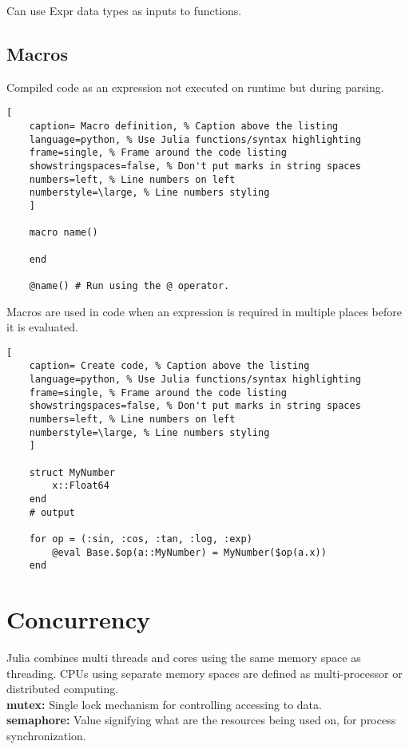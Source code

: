 \documentclass[11pt]{scrartcl} %
\begin{document}
Can use Expr data types as inputs to functions.

\subsection{Macros}

Compiled code as an expression not executed on runtime but during parsing.

\begin{lstlisting}[
	caption= Macro definition, % Caption above the listing
	language=python, % Use Julia functions/syntax highlighting
	frame=single, % Frame around the code listing
	showstringspaces=false, % Don't put marks in string spaces
	numbers=left, % Line numbers on left
	numberstyle=\large, % Line numbers styling
	]

	macro name()

	end

	@name() # Run using the @ operator.

\end{lstlisting}

Macros are used in code when an expression is required in multiple places before it is evaluated.

\begin{lstlisting}[
	caption= Create code, % Caption above the listing
	language=python, % Use Julia functions/syntax highlighting
	frame=single, % Frame around the code listing
	showstringspaces=false, % Don't put marks in string spaces
	numbers=left, % Line numbers on left
	numberstyle=\large, % Line numbers styling
	]

	struct MyNumber
    	x::Float64
	end
	# output

	for op = (:sin, :cos, :tan, :log, :exp)
    	@eval Base.$op(a::MyNumber) = MyNumber($op(a.x))
	end

\end{lstlisting}

\newpage
\section{Concurrency}

Julia combines multi threads and cores using the same memory space as threading. CPUs using
separate memory spaces are defined as multi-processor or distributed computing.\\

\textbf{mutex:} Single lock mechanism for controlling accessing to data.\\
\textbf{semaphore:} Value signifying what are the resources being used on, for process synchronization.
\end{document}
